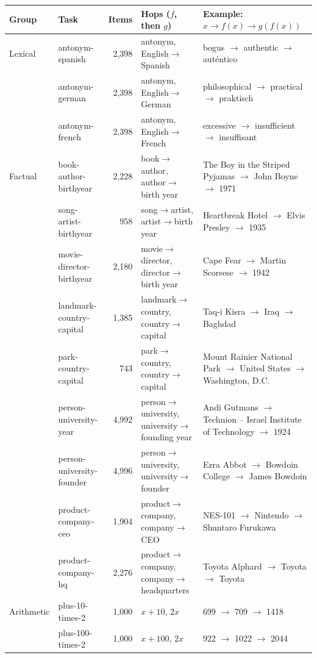 \documentclass[10pt,a4paper]{article}
\begin{document}
\begin{table}[tbp]
\centering\footnotesize
\begin{tabularx}{\textwidth}{@{}llr>{\raggedright\arraybackslash}p{3.6cm}L@{}}
\toprule
Group & Task & Items & Hops ($f$, then $g$) & Example: $x \to f(x) \to g(f(x))$ \\
\midrule
Lexical & antonym-spanish & 2{,}398 & antonym, English$\to$Spanish & bogus $\to$ authentic $\to$ auténtico \\
 & antonym-german & 2{,}398 & antonym, English$\to$German & philosophical $\to$ practical $\to$ praktisch \\
 & antonym-french & 2{,}398 & antonym, English$\to$French & excessive $\to$ insufficient $\to$ insuffisant \\
\midrule
Factual & book-author-birthyear & 2{,}228 & book$\to$author, author$\to$birth year & The Boy in the Striped Pyjamas $\to$ John Boyne $\to$ 1971 \\
 & song-artist-birthyear & 958 & song$\to$artist, artist$\to$birth year & Heartbreak Hotel $\to$ Elvis Presley $\to$ 1935 \\
 & movie-director-birthyear & 2{,}180 & movie$\to$director, director$\to$birth year & Cape Fear $\to$ Martin Scorsese $\to$ 1942 \\
 & landmark-country-capital & 1{,}385 & landmark$\to$country, country$\to$capital & Taq-i Kisra $\to$ Iraq $\to$ Baghdad \\
 & park-country-capital & 743 & park$\to$country, country$\to$capital & Mount Rainier National Park $\to$ United States $\to$ Washington, D.C. \\
 & person-university-year & 4{,}992 & person$\to$university, university$\to$founding year & Andi Gutmans $\to$ Technion -- Israel Institute of Technology $\to$ 1924 \\
 & person-university-founder & 4{,}996 & person$\to$university, university$\to$founder & Ezra Abbot $\to$ Bowdoin College $\to$ James Bowdoin \\
 & product-company-ceo & 1{,}904 & product$\to$company, company$\to$CEO & NES-101 $\to$ Nintendo $\to$ Shuntaro Furukawa \\
 & product-company-hq & 2{,}276 & product$\to$company, company$\to$headquarters & Toyota Alphard $\to$ Toyota $\to$ Toyota \\
\midrule
Arithmetic & plus-10-times-2 & 1{,}000 & $x+10$, $2x$ & 699 $\to$ 709 $\to$ 1418 \\
 & plus-100-times-2 & 1{,}000 & $x+100$, $2x$ & 922 $\to$ 1022 $\to$ 2044 \\

\end{tabularx}
\end{table}
\end{document}
